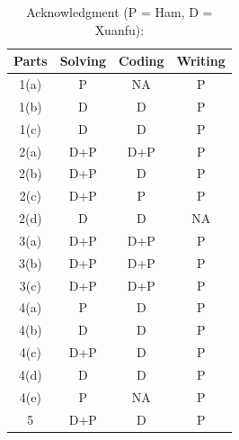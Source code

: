 \documentclass[jou]{apa}%
\begin{document}
\begin{table}[h]
\caption{Acknowledgment (P = Ham, D = Xuanfu):}
\label{tab:tab1}
\begin{tabular}{|cccc|}\hline
Parts  & Solving  & Coding & Writing \\ \hline
1(a)     & P    & NA & P \\
1(b)     &    D       &    D     & P \\
1(c)    & D    & D   & P \\
2(a)         &    D+P      &    D+P      & P \\ 
2(b)    & D+P    & D   & P \\
2(c)    & D+P    & P   & P \\
2(d)    & D    & D   & NA \\
3(a)    & D+P    & D+P   & P \\
3(b)    & D+P    & D+P   & P \\
3(c)    & D+P    & D+P   & P \\
4(a)    & P    & D   & P \\
4(b)    & D    & D   & P \\
4(c)    & D+P    & D   & P \\
4(d)    & D    & D   & P \\
4(e)    & P    & NA   & P \\
5       & D+P    & D   & P \\\hline
\end{tabular}
\end{table}  
\end{document}
